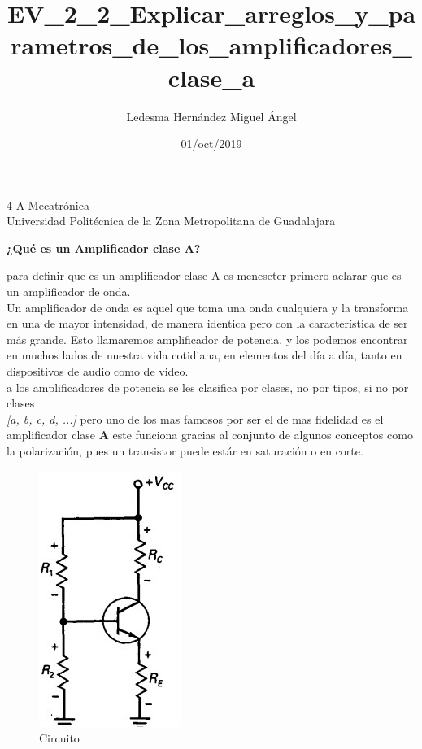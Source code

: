 \documentclass[letterpaper]{article}
\title{EV\_2\_2\_Explicar\_arreglos\_y\_parametros\_de\_los\_amplificadores\_clase\_a}
\author{Ledesma Hernández Miguel Ángel}
\date{01/oct/2019}
\begin{document}
\maketitle
\begin{large}
\begin{center}
4-A Mecatrónica\\
Universidad Politécnica de la Zona Metropolitana de Guadalajara
\end{center}



\newpage


\begin{LARGE}
\begin{center}
\textbf{¿Qué es un Amplificador clase A?}
\end{center}
\end{LARGE}
para definir que es un amplificador clase A  es meneseter primero aclarar que es un amplificador de onda.\\
Un amplificador de onda es aquel que toma una onda cualquiera y la transforma en una de mayor intensidad, de manera identica pero con la característica de ser más grande.
Esto llamaremos amplificador de potencia, y los podemos encontrar en muchos lados de nuestra vida cotidiana, en elementos del día a día, tanto en dispositivos de audio como de video.\\
a los amplificadores de potencia se les clasifica por clases, no por tipos, si no por clases\\ \textit{[a, b, c, d, ...]} pero uno de los mas famosos por ser el de mas fidelidad es el amplificador clase \textbf{A} este funciona gracias al conjunto de algunos conceptos como la polarización, pues un transistor puede estár en saturación o en corte. \\
\begin{figure}[hbtp]
\caption{Circuito}
\centering
\includegraphics[scale=.5]{Imagenes/Polarizacion.png}

\end{figure}
\end{large}
\end{document}
